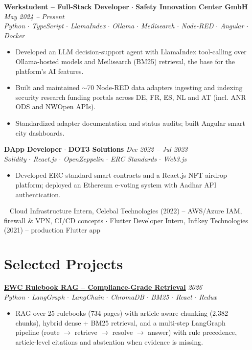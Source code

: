 \documentclass[a4paper,9pt]{extarticle}
\newcommand{\jobentry}[4]{%
	\vspace{2pt}\noindent%
	{\bfseries\color{black} #1} {\color{gray} $\cdot$ } {\bfseries\color{light} #2}%
	\hfill {\itshape\color{gray} #4}\\[1pt]%
	{\itshape\color{gray}\small #3}\par\vspace{1pt}%
}
\newcommand{\projentry}[3]{%
	\vspace{2pt}\noindent%
	{\bfseries\color{black} #1}\hfill{\itshape\color{gray} #2}\\[1pt]%
	{\itshape\color{gray}\small #3}\par\vspace{1pt}%
}
\begin{document}
	\jobentry{Werkstudent -- Full-Stack Developer}{Safety Innovation Center GmbH}{Python $\cdot$ TypeScript $\cdot$ LlamaIndex $\cdot$ Ollama $\cdot$ Meilisearch $\cdot$ Node-RED $\cdot$ Angular $\cdot$ Docker}{May 2024 -- Present}
	\begin{itemize}
		\item Developed an LLM decision-support agent with LlamaIndex tool-calling over Ollama-hosted models and Meilisearch (BM25) retrieval, the base for the platform's AI features.
		\item Built and maintained $\sim$70 Node-RED data adapters ingesting and indexing security research funding portals across DE, FR, ES, NL and AT (incl. ANR ODS and NWOpen APIs).
		\item Standardized adapter documentation and status audits; built Angular smart city dashboards.
	\end{itemize}

	\jobentry{DApp Developer}{DOT3 Solutions}{Solidity $\cdot$ React.js $\cdot$ OpenZeppelin $\cdot$ ERC Standards $\cdot$ Web3.js}{Dec 2022 -- Jul 2023}
	\begin{itemize}
		\item Developed ERC-standard smart contracts and a React.js NFT airdrop platform; deployed an Ethereum e-voting system with Aadhar API authentication.
	\end{itemize}

	\vspace{2pt}~{\color{gray} Cloud Infrastructure Intern, \textcolor{light}{Celebal Technologies} (2022) -- AWS/Azure IAM, firewall \& VPN, CI/CD concepts $\cdot$ Flutter Developer Intern, \textcolor{light}{Infikey Technologies} (2021) -- production Flutter app}\par

	\section{Selected Projects}

	\projentry{\href{https://github.com/YashikKhunt/ewc-rulebook-rag}{\color{black}EWC Rulebook RAG -- Compliance-Grade Retrieval}}{2026}{Python $\cdot$ LangGraph $\cdot$ LangChain $\cdot$ ChromaDB $\cdot$ BM25 $\cdot$ React $\cdot$ Redux}
	\begin{itemize}
		\item RAG over 25 rulebooks (734 pages) with article-aware chunking (2{,}382 chunks), hybrid dense + BM25 retrieval, and a multi-step LangGraph pipeline (route $\rightarrow$ retrieve $\rightarrow$ resolve $\rightarrow$ answer) with rule precedence, article-level citations and abstention when evidence is missing.
	\end{itemize}
\end{document}
